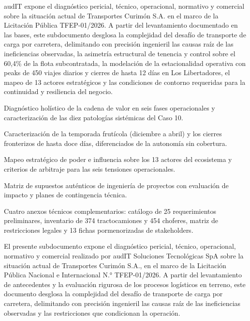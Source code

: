 
\begin{resumenApertura}
audIT expone el diagnóstico pericial, técnico, operacional, normativo y comercial sobre la situación actual de Transportes Curimón S.A. en el marco de la Licitación Pública TFEP-01/2026. A partir del levantamiento documentado en las bases, este subdocumento desglosa la complejidad del desafío de transporte de carga por carretera, delimitando con precisión ingenieril las causas raíz de las ineficiencias observadas, la asimetría estructural de tenencia y control sobre el 60,4\% de la flota subcontratada, la modelación de la estacionalidad operativa con peaks de 450 viajes diarios y cierres de hasta 12 días en Los Libertadores, el mapeo de 13 actores estratégicos y las condiciones de contorno requeridas para la continuidad y resiliencia del negocio.
\begin{recibe}
  \item Diagnóstico holístico de la cadena de valor en seis fases operacionales y caracterización de las diez patologías sistémicas del Caso 10.
  \item Caracterización de la temporada frutícola (diciembre a abril) y los cierres fronterizos de hasta doce días, diferenciados de la autonomía sin cobertura.
  \item Mapeo estratégico de poder e influencia sobre los 13 actores del ecosistema y criterios de arbitraje para las seis tensiones operacionales.
  \item Matriz de supuestos auténticos de ingeniería de proyectos con evaluación de impacto y planes de contingencia técnica.
  \item Cuatro anexos técnicos complementarios: catálogo de 25 requerimientos preliminares, inventario de 374 tractocamiones y 454 choferes, matriz de restricciones legales y 13 fichas pormenorizadas de stakeholders.
\end{recibe}
\end{resumenApertura}

El presente subdocumento expone el diagnóstico pericial, técnico, operacional, normativo y comercial realizado por audIT Soluciones Tecnológicas SpA sobre la situación actual de Transportes Curimón S.A., en el marco de la Licitación Pública Nacional e Internacional N.° TFEP-01/2026. A partir del levantamiento de antecedentes y la evaluación rigurosa de los procesos logísticos en terreno, este documento desglosa la complejidad del desafío de transporte de carga por carretera, delimitando con precisión ingenieril las causas raíz de las ineficiencias observadas y las restricciones que condicionan la operación.

